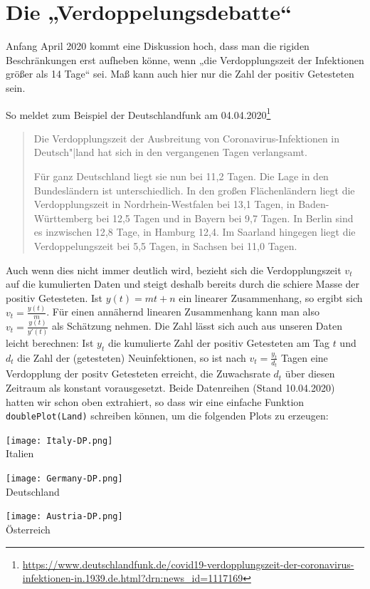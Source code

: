 \documentclass[a4paper,11pt]{article}
\begin{document}
\section{Die „Verdoppelungsdebatte“}

Anfang April 2020 kommt eine Diskussion hoch, dass man die rigiden
Beschränkungen erst aufheben könne, wenn „die Verdopplungszeit der Infektionen
größer als 14 Tage“ sei.  Maß kann auch hier nur die Zahl der positiv
Getesteten sein. 

So meldet zum Beispiel der Deutschlandfunk am 04.04.2020\footnote{\raggedright
  \url{https://www.deutschlandfunk.de/covid19-verdopplungszeit-der-coronavirus-infektionen-in.1939.de.html?drn:news_id=1117169}}
\begin{quote}
  Die Verdopplungszeit der Ausbreitung von Coronavirus-Infektionen in
  Deutsch"|land hat sich in den vergangenen Tagen verlangsamt.

  Für ganz Deutschland liegt sie nun bei 11{,}2 Tagen. Die Lage in den
  Bundesländern ist unterschiedlich. In den großen Flächenländern liegt die
  Verdopplungszeit in Nordrhein-Westfalen bei 13{,}1 Tagen, in
  Baden-Württemberg bei 12{,}5 Tagen und in Bayern bei 9{,}7 Tagen. In Berlin
  sind es inzwischen 12{,}8 Tage, in Hamburg 12{,}4. Im Saarland hingegen
  liegt die Verdoppelungszeit bei 5{,}5 Tagen, in Sachsen bei 11{,}0 Tagen.
\end{quote}
Auch wenn dies nicht immer deutlich wird, bezieht sich die Verdopplungszeit
$v_t$ auf die kumulierten Daten und steigt deshalb bereits durch die schiere
Masse der positiv Getesteten.  Ist $y(t)=mt+n$ ein linearer Zusammenhang, so
ergibt sich $v_t=\frac{y(t)}{m}$. Für einen annähernd linearen Zusammenhang
kann man also $v_t=\frac{y(t)}{y'(t)}$ als Schätzung nehmen.  Die Zahl lässt
sich auch aus unseren Daten leicht berechnen: Ist $y_t$ die kumulierte Zahl
der positiv Getesteten am Tag $t$ und $d_t$ die Zahl der (getesteten)
Neuinfektionen, so ist nach $v_t=\frac{y_t}{d_t}$ Tagen eine Verdopplung der
positv Getesteten erreicht, die Zuwachsrate $d_t$ über diesen Zeitraum als
konstant vorausgesetzt.  Beide Datenreihen (Stand 10.04.2020) hatten wir schon
oben extrahiert, so dass wir eine einfache Funktion \texttt{doublePlot(Land)}
schreiben können, um die folgenden Plots zu erzeugen:
\begin{center}  
  \begin{minipage}{.33\textwidth}\centering
    \texttt{[image: Italy-DP.png]}\\[1em] {Italien}
  \end{minipage}\hfill
  \begin{minipage}{.33\textwidth}\centering
    \texttt{[image: Germany-DP.png]}\\[1em] {Deutschland}
  \end{minipage}\hfill
  \begin{minipage}{.33\textwidth}\centering
    \texttt{[image: Austria-DP.png]}\\[1em] {Österreich}
  \end{minipage}
\end{center}
\end{document}
